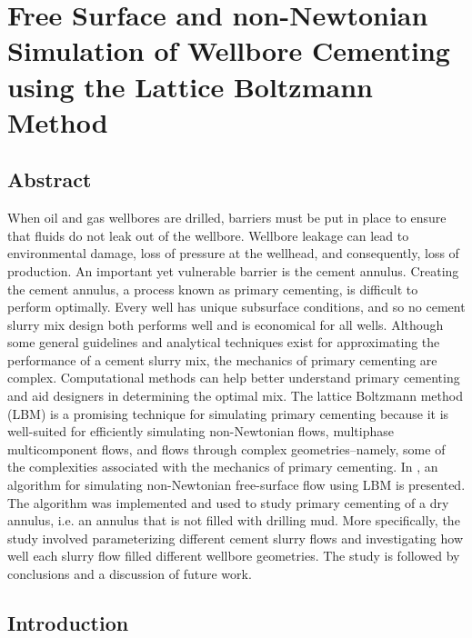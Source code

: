 \documentclass[pdftex,ms]{pittetd}
\begin{document}

\chapter{Free Surface and non-Newtonian Simulation of Wellbore Cementing using the Lattice Boltzmann Method} \label{chap:lbm-cement}

\section*{Abstract}

When oil and gas wellbores are drilled, barriers must be put in place to ensure that fluids do not leak out of the wellbore.
Wellbore leakage can lead to environmental damage, loss of pressure at the wellhead, and consequently, loss of production.
An important yet vulnerable barrier is the cement annulus.
Creating the cement annulus, a process known as primary cementing, is difficult to perform optimally.
Every well has unique subsurface conditions, and so no cement slurry mix design both performs well and is economical for all wells.
Although some general guidelines and analytical techniques exist for approximating the performance of a cement slurry mix, the mechanics of primary cementing are complex.
Computational methods can help better understand primary cementing and aid designers in determining the optimal mix.
The lattice Boltzmann method (LBM) is a promising technique for simulating primary cementing because it is well-suited for efficiently simulating non-Newtonian flows, multiphase multicomponent flows, and flows through complex geometries--namely, some of the complexities associated with the mechanics of primary cementing.
In , an algorithm for simulating non-Newtonian free-surface flow using LBM is presented.
The algorithm was implemented and used to study primary cementing of a dry annulus, i.e. an annulus that is not filled with drilling mud.
More specifically, the study involved parameterizing different cement slurry flows and investigating how well each slurry flow filled different wellbore geometries.
The study is followed by conclusions and a discussion of future work.

\section{Introduction}
\end{document}
